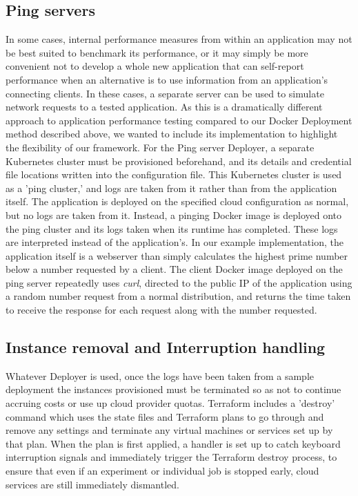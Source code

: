 \documentclass{report}
\begin{document}
\subsection{Ping servers}
In some cases, internal performance measures from within an application may not be best suited to benchmark its performance, or it may simply be more convenient not to develop a whole new application that can self-report performance when an alternative is to use information from an application's connecting clients. 
In these cases, a separate server can be used to simulate network requests to a tested application. As this is a dramatically different approach to application performance testing compared to our Docker Deployment method described above, we wanted to include its implementation to highlight the flexibility of our framework.
For the Ping server Deployer, a separate Kubernetes cluster must be provisioned beforehand, and its details and credential file locations written into the configuration file. This Kubernetes cluster is used as a 'ping cluster,' and logs are taken from it rather than from the application itself. The application is deployed on the specified cloud configuration as normal, but no logs are taken from it. Instead, a pinging Docker image is deployed onto the ping cluster and its logs taken when its runtime has completed. These logs are interpreted instead of the application's. In our example implementation, the application itself is a webserver than simply calculates the highest prime number below a number requested by a client. The client Docker image deployed on the ping server repeatedly uses \textit{curl}, directed to the public IP of the application using a random number request from a normal distribution, and returns the time taken to receive the response for each request along with the number requested.  
\subsection{Instance removal and Interruption handling}
Whatever Deployer is used, once the logs have been taken from a sample deployment the instances provisioned must be terminated so as not to continue accruing costs or use up cloud provider quotas. Terraform includes a 'destroy' command which uses the state files and Terraform plans to go through and remove any settings and terminate any virtual machines or services set up by that plan.
When the plan is first applied, a handler is set up to catch keyboard interruption signals and immediately trigger the Terraform destroy process, to ensure that even if an experiment or individual job is stopped early, cloud services are still immediately dismantled. 
\end{document}
